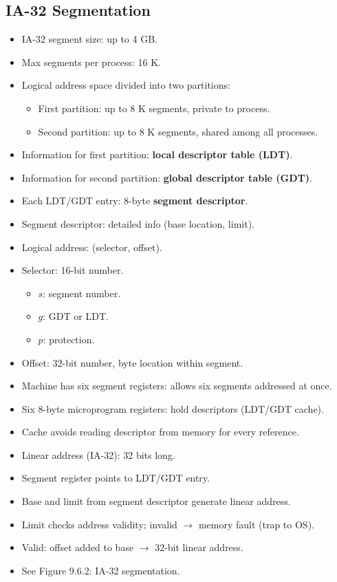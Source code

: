 \subsection*{IA-32 Segmentation}
\begin{itemize}
    \item IA-32 segment size: up to 4 GB.
    \item Max segments per process: 16 K.
    \item Logical address space divided into two partitions:
    \begin{itemize}
        \item First partition: up to 8 K segments, private to process.
        \item Second partition: up to 8 K segments, shared among all processes.
    \end{itemize}
    \item Information for first partition: \textbf{local descriptor table (LDT)}.
    \item Information for second partition: \textbf{global descriptor table (GDT)}.
    \item Each LDT/GDT entry: 8-byte \textbf{segment descriptor}.
    \item Segment descriptor: detailed info (base location, limit).
    \item Logical address: (selector, offset).
    \item Selector: 16-bit number.
    \begin{itemize}
        \item $s$: segment number.
        \item $g$: GDT or LDT.
        \item $p$: protection.
    \end{itemize}
    \item Offset: 32-bit number, byte location within segment.
    \item Machine has six segment registers: allows six segments addressed at once.
    \item Six 8-byte microprogram registers: hold descriptors (LDT/GDT cache).
    \item Cache avoids reading descriptor from memory for every reference.
    \item Linear address (IA-32): 32 bits long.
    \item Segment register points to LDT/GDT entry.
    \item Base and limit from segment descriptor generate linear address.
    \item Limit checks address validity; invalid $\rightarrow$ memory fault (trap to OS).
    \item Valid: offset added to base $\rightarrow$ 32-bit linear address.
    \item See Figure 9.6.2: IA-32 segmentation.
\end{itemize}

